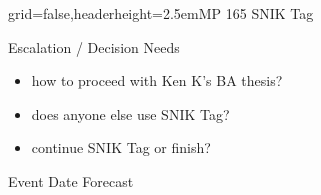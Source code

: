 \documentclass[english]{kiesgrube}
\begin{document}
\begin{poster}{grid=false,headerheight=2.5em}{}{MP 165 SNIK Tag}{}{}
\begin{posterbox}[name=escalation,column=1,below=risks]{Escalation / Decision Needs}
\begin{itemize}
\item how to proceed with Ken K's BA thesis?
\item does anyone else use SNIK Tag?
\item continue SNIK Tag or finish?
\end{itemize}
\end{posterbox}
\begin{posterbox}[name=event,column=0,below=progress]{Event Date Forecast}
\begin{tabulary}{\textwidth}{lL}
\end{tabulary}
\end{posterbox}
\footer{}
\end{poster}

\newpage
\end{document}
